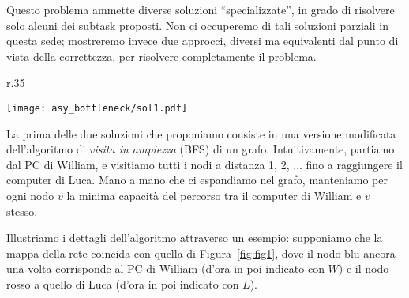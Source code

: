 \newpage
\setcounter{figure}{0}
\pagecolor{backcolor}

\Solution
Questo problema ammette diverse soluzioni ``specializzate'', in grado di risolvere solo alcuni dei subtask proposti. Non ci occuperemo di tali soluzioni parziali in questa sede; mostreremo invece due approcci, diversi ma equivalenti dal punto di vista della correttezza, per risolvere completamente il problema. 

\SolUnaBfs
\begin{wrapfigure}{r}{.35\textwidth}
  \vspace*{-.8cm}
  \begin{flushright}
		\texttt{[image: asy\_bottleneck/sol1.pdf]}
		\caption{Mappa d'esempio.}
		\label{fig:fig1}
	\end{flushright}
	\vspace*{-1cm}
\end{wrapfigure}
La prima delle due soluzioni che proponiamo consiste in una versione modificata dell'algoritmo di \emph{visita in ampiezza} (BFS) di un grafo. Intuitivamente, partiamo dal PC di William, e visitiamo tutti i nodi a distanza 1, 2, $\dots$ fino a raggiungere il computer di Luca.
Mano a mano che ci espandiamo nel grafo, manteniamo per ogni nodo $v$ la minima capacità del percorso tra il computer di William e $v$ stesso.

Illustriamo i dettagli dell'algoritmo attraverso un esempio: supponiamo che la mappa della rete coincida con quella di Figura~\ref{fig:fig1}, dove il nodo blu ancora una volta corrisponde al PC di William (d'ora in poi indicato con $W$) e il nodo rosso a quello di Luca (d'ora in poi indicato con $L$).

